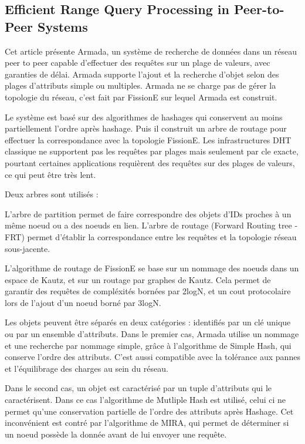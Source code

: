 \documentclass{article}
\begin{document}
\subsection{Efficient Range Query Processing in Peer-to-Peer Systems
\cite{4527242}
}
	Cet article présente Armada, un système de recherche de données dans un réseau peer to peer capable d'effectuer
des requêtes sur un plage de valeurs, avec garanties de délai. Armada supporte l'ajout et la recherche d'objet
selon des plages d'attributs simple ou multiples. Armada ne se charge pas de gérer la topologie du réseau, c'est
fait par FissionE sur lequel Armada est construit.

	Le système est basé sur des algorithmes de hashages qui conservent au moins partiellement l'ordre après
hashage. Puis il construit un arbre de routage pour effectuer la correspondance avec la topologie FissionE.
Les infrastructures DHT classique ne supportent pas les requêtes par plages mais seulement par cle exacte, pourtant
certaines applications requièrent des requêtes sur des plages de valeurs, ce qui peut être très lent.

	Deux arbres sont utilisés :

L'arbre de partition permet de faire correspondre des objets d'IDs proches à un même noeud ou
a des noeuds en lien.
L'arbre de routage (Forward Routing tree - FRT) permet d'établir la correspondance entre les requêtes et la
topologie réseau sous-jacente.

L'algorithme de routage de FissionE se base sur un nommage des noeuds dans un espace de Kautz, et sur un routage
par graphes de Kautz. Cela permet de garantir des requêtes de compléxités bornées par 2logN, et un cout protocolaire
lors de l'ajout d'un noeud borné par 3logN.

Les objets peuvent être séparés en deux catégories : identifiés par un clé unique ou par un ensemble d'attributs.
Dans le premier cas, Armada utilise un nommage et une recherche par nommage simple, grâce à l'algorithme de Simple Hash, qui conserve l'ordre des attributs. C'est aussi compatible avec la tolérance aux pannes et l'équilibrage des charges au sein du réseau.

Dans le second cas, un objet est caractérisé par un tuple d'attributs qui le caractérisent. Dans ce cas l'algorithme
de Mutliple Hash est utilisé, celui ci ne permet qu'une conservation partielle de l'ordre des attributs après
Hashage. Cet inconvénient est contré par l'algorithme de MIRA, qui permet de déterminer si un noeud possède la donnée avant de lui envoyer une requête.
\end{document}
